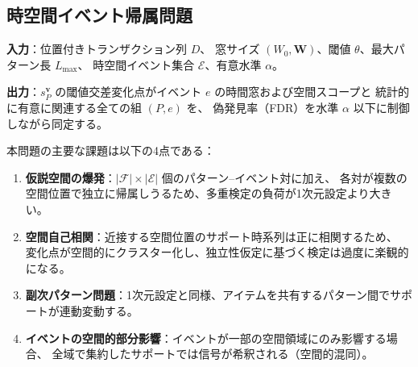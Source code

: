 \subsection{時空間イベント帰属問題}

\begin{problem}[時空間イベント帰属]\label{prob:st_attribution}
\textbf{入力}：位置付きトランザクション列 $D$、
窓サイズ $(W_0, \mathbf{W})$、閾値 $\theta$、最大パターン長 $L_{\max}$、
時空間イベント集合 $\mathcal{E}$、有意水準 $\alpha$。

\textbf{出力}：$s_P^{\mathbf{v}}$ の閾値交差変化点がイベント $e$ の時間窓および空間スコープと
統計的に有意に関連する全ての組 $(P, e)$ を、
偽発見率（FDR）を水準 $\alpha$ 以下に制御しながら同定する。
\end{problem}

本問題の主要な課題は以下の4点である：
\begin{enumerate}
\item \textbf{仮説空間の爆発}：$|\mathcal{F}| \times |\mathcal{E}|$ 個のパターン--イベント対に加え、
各対が複数の空間位置で独立に帰属しうるため、多重検定の負荷が1次元設定より大きい。

\item \textbf{空間自己相関}：近接する空間位置のサポート時系列は正に相関するため、
変化点が空間的にクラスター化し、独立性仮定に基づく検定は過度に楽観的になる。

\item \textbf{副次パターン問題}：1次元設定と同様、アイテムを共有するパターン間でサポートが連動変動する。

\item \textbf{イベントの空間的部分影響}：イベントが一部の空間領域にのみ影響する場合、
全域で集約したサポートでは信号が希釈される（空間的混同）。
\end{enumerate}
